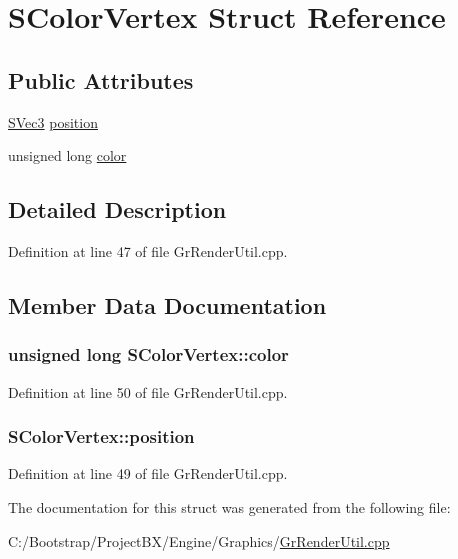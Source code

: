\hypertarget{struct_s_color_vertex}{
\section{SColorVertex Struct Reference}
\label{struct_s_color_vertex}
}
\subsection*{Public Attributes}
\begin{CompactItemize}
\item 
\hyperlink{struct_s_vec3}{SVec3} \hyperlink{struct_s_color_vertex_0bfdb3a6284d5be8114d7fea1c830b60}{position}
\item 
unsigned long \hyperlink{struct_s_color_vertex_962359a8443bac073fa0e3e537101f88}{color}
\end{CompactItemize}


\subsection{Detailed Description}


Definition at line 47 of file GrRenderUtil.cpp.

\subsection{Member Data Documentation}
\hypertarget{struct_s_color_vertex_962359a8443bac073fa0e3e537101f88}{
\subsubsection[{color}]{\setlength{\rightskip}{0pt plus 5cm}unsigned long {\bf SColorVertex::color}}}
\label{struct_s_color_vertex_962359a8443bac073fa0e3e537101f88}




Definition at line 50 of file GrRenderUtil.cpp.\hypertarget{struct_s_color_vertex_0bfdb3a6284d5be8114d7fea1c830b60}{
\subsubsection[{position}]{ {\bf SColorVertex::position}}}
\label{struct_s_color_vertex_0bfdb3a6284d5be8114d7fea1c830b60}




Definition at line 49 of file GrRenderUtil.cpp.

The documentation for this struct was generated from the following file:\begin{CompactItemize}
\item 
C:/Bootstrap/ProjectBX/Engine/Graphics/\hyperlink{_gr_render_util_8cpp}{GrRenderUtil.cpp}\end{CompactItemize}
